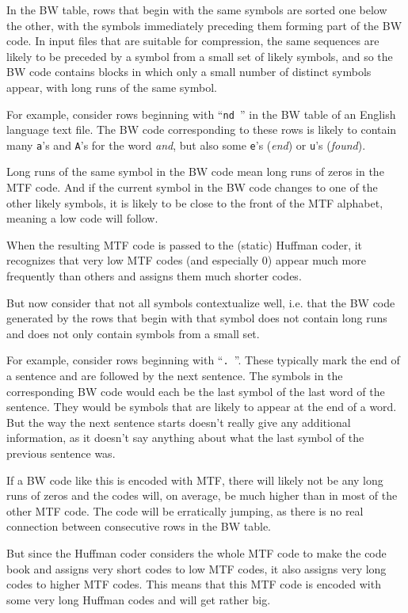 \documentclass[a4paper]{scrreprt}
\begin{document}
In the BW table, rows that begin with the same symbols are sorted one below the
other, with the symbols immediately preceding them forming part of the BW code.
In input files that are suitable for compression, the same sequences are likely
to be preceded by a symbol from a small set of likely symbols, and so the BW
code contains blocks in which only a small number of distinct symbols appear,
with long runs of the same symbol.

For example, consider rows beginning with ``\texttt{nd }'' in the BW table of an
English language text file. The BW code corresponding to these rows is likely to
contain many \texttt{a}'s and \texttt{A}'s for the word \emph{and}, but also
some \texttt{e}'s (\emph{end}) or \texttt{u}'s (\emph{found}).

Long runs of the same symbol in the BW code mean long runs of zeros in the MTF
code. And if the current symbol in the BW code changes to one of the other
likely symbols, it is likely to be close to the front of the MTF alphabet,
meaning a low code will follow.

When the resulting MTF code is passed to the (static) Huffman coder, it
recognizes that very low MTF codes (and especially 0) appear much more
frequently than others and assigns them much shorter codes.

But now consider that not all symbols contextualize well, i.e. that the BW code
generated by the rows that begin with that symbol does not contain long runs and
does not only contain symbols from a small set.

For example, consider rows beginning with ``\texttt{. }''. These typically mark
the end of a sentence and are followed by the next sentence. The symbols in the
corresponding BW code would each be the last symbol of the last word of the
sentence. They would be symbols that are likely to appear at the end of a
word. But the way the next sentence starts doesn't really give any additional
information, as it doesn't say anything about what the last symbol of the
previous sentence was.

If a BW code like this is encoded with MTF, there will likely not be any long
runs of zeros and the codes will, on average, be much higher than in most of the
other MTF code. The code will be erratically jumping, as there is no real
connection between consecutive rows in the BW table.

But since the Huffman coder considers the whole MTF code to make the code
book and assigns very short codes to low MTF codes, it also assigns very long
codes to higher MTF codes. This means that this MTF code is encoded with some
very long Huffman codes and will get rather big.
\end{document}
